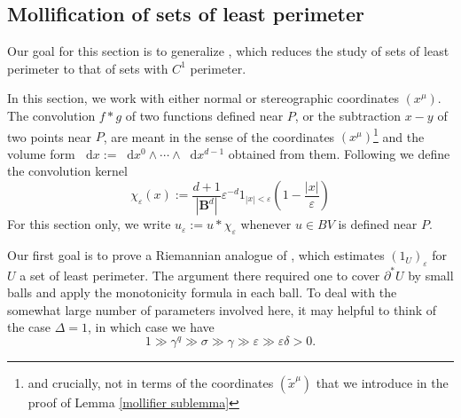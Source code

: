 \documentclass[reqno,10pt]{amsart}
\newcommand{\Ball}{\mathbf{B}}
\newcommand*\dif{\mathop{}\!\mathrm{d}}
\theoremstyle{definition}
\numberwithin{equation}{section}
\begin{document}
\subsection{Mollification of sets of least perimeter}
Our goal for this section is to generalize \cite[Lemma 7.5]{Giusti77}, which reduces the study of sets of least perimeter to that of sets with $C^1$ perimeter.

In this section, we work with either normal or stereographic coordinates $(x^\mu)$.
The convolution $f * g$ of two functions defined near $P$, or the subtraction $x - y$ of two points near $P$, are meant in the sense of the coordinates $(x^\mu)$\footnote{and crucially, not in terms of the coordinates $(\tilde x^\mu)$ that we introduce in the proof of Lemma \ref{mollifier sublemma}} and the volume form $\dif x := \dif x^0 \wedge \cdots \wedge \dif x^{d - 1}$ obtained from them. Following \cite[Chapter 7]{Giusti77} we define the convolution kernel
$$\chi_\varepsilon(x) := \frac{d + 1}{|\Ball^d|} \varepsilon^{-d}1_{|x| < \varepsilon} \left(1 - \frac{|x|}{\varepsilon}\right)$$
For this section only, we write $u_\varepsilon := u * \chi_\varepsilon$ whenever $u \in BV$ is defined near $P$.

Our first goal is to prove a Riemannian analogue of \cite[Theorem 7.3]{Giusti77}, which estimates $(1_U)_\varepsilon$ for $U$ a set of least perimeter.
The argument there required one to cover $\partial^* U$ by small balls and apply the monotonicity formula in each ball.
To deal with the somewhat large number of parameters involved here, it may helpful to think of the case $\Delta = 1$, in which case we have
$$1 \gg \gamma^q \gg \sigma \gg \gamma \gg \varepsilon \gg \varepsilon \delta > 0.$$
\end{document}
